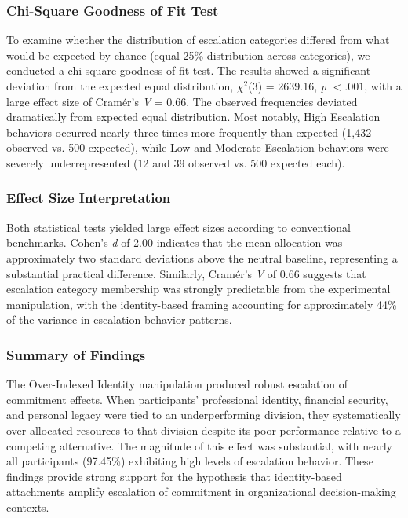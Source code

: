 \documentclass[letterpaper]{article} %
\begin{document}
\subsubsection{Chi-Square Goodness of Fit Test}

To examine whether the distribution of escalation categories differed from what would be expected by chance (equal 25\% distribution across categories), we conducted a chi-square goodness of fit test. The results showed a significant deviation from the expected equal distribution, $\chi^2$(3) = 2639.16, \textit{p} $< .001$, with a large effect size of Cramér's \textit{V} = 0.66. The observed frequencies deviated dramatically from expected equal distribution. Most notably, High Escalation behaviors occurred nearly three times more frequently than expected (1,432 observed vs. 500 expected), while Low and Moderate Escalation behaviors were severely underrepresented (12 and 39 observed vs. 500 expected each).

\subsubsection{Effect Size Interpretation}

Both statistical tests yielded large effect sizes according to conventional benchmarks. Cohen's \textit{d} of 2.00 indicates that the mean allocation was approximately two standard deviations above the neutral baseline, representing a substantial practical difference. Similarly, Cramér's \textit{V} of 0.66 suggests that escalation category membership was strongly predictable from the experimental manipulation, with the identity-based framing accounting for approximately 44\% of the variance in escalation behavior patterns.

\subsubsection{Summary of Findings}

The Over-Indexed Identity manipulation produced robust escalation of commitment effects. When participants' professional identity, financial security, and personal legacy were tied to an underperforming division, they systematically over-allocated resources to that division despite its poor performance relative to a competing alternative. The magnitude of this effect was substantial, with nearly all participants (97.45\%) exhibiting high levels of escalation behavior. These findings provide strong support for the hypothesis that identity-based attachments amplify escalation of commitment in organizational decision-making contexts.
\end{document}
